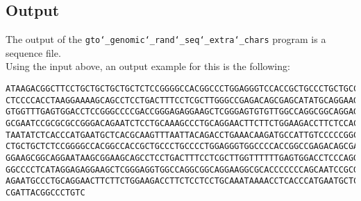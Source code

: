 \subsection*{Output}
The output of the \texttt{gto\char`_genomic\char`_rand\char`_seq\char`_extra\char`_chars} program is a sequence file.\\
Using the input above, an output example for this is the following:
\begin{lstlisting}
ATAAGACGGCTTCCTGCTGCTGCTGCTCTCCGGGGCCACGGCCCTGGAGGGTCCACCGCTGCCCTGCTGCCATTGTCCCC
CTCCCCACCTAAGGAAAAGCAGCCTCCTGACTTTCCTCGCTTGGGCCGAGACAGCGAGCATATGCAGGAAGCGGCAGGAA
GTGGTTTGAGTGGACCTCCGGGCCCCGACCGGGAGAGGAAGCTCGGGAGTGTGTTGGCCAGGCGGCAGGAGACCAGTGCC
GCGAATCCGCGCGCCGGGACAGAATCTCCTGCAAAGCCCTGCAGGAACTTCTTCTGGAAGACCTTCTCCACCCCCCCAGC
TAATATCTCACCCATGAATGCTCACGCAAGTTTAATTACAGACCTGAAACAAGATGCCATTGTCCCCCGGCCTCCTGCTG
CTGCTGCTCTCCGGGGCCACGGCCACCGCTGCCCTGCCCCTGGAGGGTGGCCCCACCGGCCGAGACAGCGAGCATATGCA
GGAAGCGGCAGGAATAAGCGGAAGCAGCCTCCTGACTTTCCTCGCTTGGTTTTTTGAGTGGACCTCCCAGGCCAGTGCCG
GGCCCCTCATAGGAGAGGAAGCTCGGGAGGTGGCCAGGCGGCAGGAAGGCGCACCCCCCCAGCAATCCGCGCGCCGGGAC
AGAATGCCCTGCAGGAACTTCTTCTGGAAGACCTTCTCCTCCTGCAAATAAAACCTCACCCATGAATGCTCACGCAAGTT
CGATTACGGCCCTGTC
\end{lstlisting}